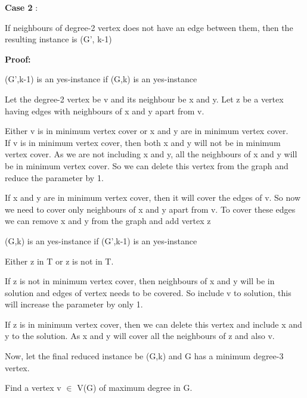 \textbf{Case 2} : 
\begin{theorem}
       If neighbours of degree-2 vertex does not have an edge between them, then the
resulting instance is (G', k-1)
\end{theorem}

\textbf{Proof:}

\hfill \vspace{-1.5cm}
       \begin{center}
              (G',k-1) is an yes-instance if (G,k) is an yes-instance               
       \end{center}
Let the degree-2 vertex be v and its neighbour be x and y. Let z be a vertex having edges with 
neighbours of x and y apart from v. 

Either v is in minimum vertex cover or x and y are in minimum vertex cover. \\
\hspace*{2cm} If v is in minimum vertex cover, then 
 both x and y will not be in minimum vertex cover. As we are not including x and y,
all the neighbours of x and y will be in minimum vertex cover. So we can delete this vertex
from the graph and reduce the parameter by 1.

\hspace*{2cm} If x and y are in minimum vertex cover, then it will cover the edges of v. So now we need to cover only neighbours
of x and y apart from v. To cover these edges we can remove x and y from the graph and add vertex 
z
       \begin{center}
              (G,k) is an yes-instance if (G',k-1) is an yes-instance               
       \end{center}
Either z in T or z is not in T. 

If z is not in minimum vertex cover, then neighbours of x and y will be in solution and edges of vertex 
needs to be covered. So include v to solution, this will increase the parameter by only 1. 

If z is in minimum vertex cover, then we can delete this vertex and include x and y to the solution.
As x and y will cover all the neighbours of z and also v.

Now, let the final reduced instance be (G,k) and G has a minimum degree-3 vertex. 

Find a vertex v $\in$ V(G) of maximum degree in G. 

